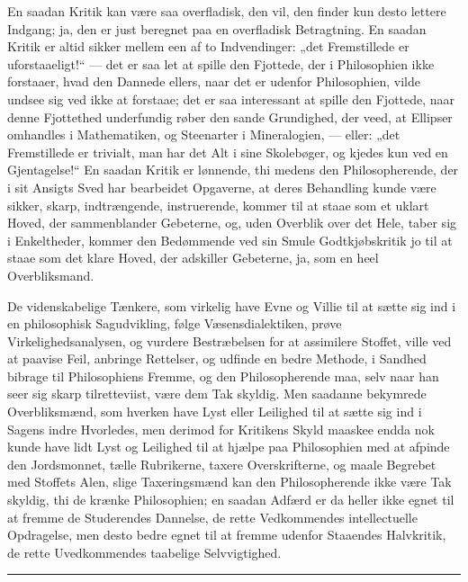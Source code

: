 \documentclass[12pt]{book}
\newcommand{\opage}[1]{\marginnote{\footnotesize\textit{[#1]}}}
\begin{document}
En saadan Kritik kan være saa overfladisk, den vil, den finder kun desto lettere Indgang; ja, den er
just beregnet paa en overfladisk Betragtning. En saadan Kritik er altid sikker mellem een af to
Indvendinger: „det Fremstillede er uforstaaeligt!“ --- det er saa let at spille den Fjottede, der i
Philosophien ikke forstaaer, hvad den Dannede ellers, naar det er udenfor Philosophien, vilde undsee
sig ved ikke at forstaae; det er saa interessant at spille den Fjottede, naar denne Fjottethed
underfundig røber den sande Grundighed, der veed, at Ellipser omhandles i Mathematiken, og Steenarter i
Mineralogien, --- eller: „det Fremstillede er trivialt, man har det Alt i sine Skolebøger, og kjedes
kun ved en Gjentagelse!“ En saadan Kritik er lønnende, thi medens den Philosopherende, der i sit
Ansigts Sved har bearbeidet Opgaverne, at deres Behandling kunde være sikker, skarp, indtrængende,
instruerende, kommer til at staae som et uklart Hoved, der sammenblander Gebeterne, og, uden Overblik
over det Hele, taber sig i Enkeltheder, kommer den Bedømmende ved sin Smule Godtkjøbskritik jo til at
staae som det klare Hoved, der adskiller Gebeterne, ja, som en heel Overbliksmand.

De videnskabelige Tænkere, som virkelig have Evne og Villie til at sætte sig ind i en philosophisk
Sagudvikling, følge Væsensdialektiken, prøve Virkelighedsanalysen, og vurdere Bestræbelsen for at
assimilere Stoffet, ville ved at paavise Feil, anbringe Rettelser, og udfinde en bedre Methode, i
Sandhed bibrage til Philosophiens Fremme, og den Philosopherende maa, selv naar han seer sig skarp
tilretteviist, være dem Tak skyldig. Men saadanne bekymrede Overbliksmænd, som hverken have Lyst eller
Leilighed til at sætte sig ind i Sagens indre Hvorledes, men derimod for Kritikens Skyld maaskee endda
nok kunde have lidt Lyst og Leilighed til at hjælpe paa Philosophien med at afpinde den
\opage{204} Jordsmonnet, tælle Rubrikerne, taxere Overskrifterne, og maale Begrebet med Stoffets Alen, slige
Taxeringsmænd kan den Philosopherende ikke være Tak skyldig, thi de krænke Philosophien; en saadan
Adfærd er da heller ikke egnet til at fremme de Studerendes Dannelse, de rette Vedkommendes
intellectuelle Opdragelse, men desto bedre egnet til at fremme udenfor Staaendes Halvkritik, de rette
Uvedkommendes taabelige Selvvigtighed.

\begin{center}\rule{0.35\linewidth}{0.4pt}\end{center}
\end{document}
